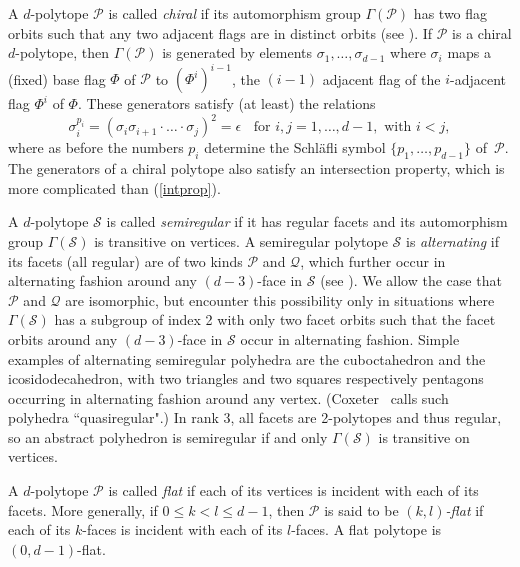 \documentclass[12pt]{amsart}
\theoremstyle{definition}
\begin{document}
A $d$-polytope $\mathcal{P}$ is called \emph{chiral\/} if its automorphism group $\Gamma(\mathcal{P})$ has two flag orbits such that any two adjacent flags are in distinct orbits (see \cite{Pel2025,SchWei1991}). If $\mathcal{P}$ is a chiral $d$-polytope, then $\Gamma(\mathcal{P})$ is generated by elements $\sigma_1,\ldots,\sigma_{d-1}$ where $\sigma_i$ maps a (fixed) base flag $\Phi$ of $\mathcal{P}$ to $(\Phi^{i})^{i-1}$, the $(i-1)$ adjacent flag of the $i$-adjacent flag $\Phi^i$ of $\Phi$. These generators satisfy (at least) the relations
\begin{equation}
\label{chiralrel}
\sigma_i^{p_i} = (\sigma_i\sigma_{i+1}\cdot\ldots\cdot\sigma_j)^{2} = \epsilon
\;\; \textrm{ for } i,j=1,\dots,d-1,  \textrm{ with } i<j,
\end{equation}
where as before the numbers $p_i$ determine the Schl\"afli symbol $\{p_1,\ldots,p_{d-1}\}$ of~$\mathcal{P}$. The generators of a chiral polytope also satisfy an intersection property, which is more complicated than (\ref{intprop}).

A $d$-polytope $\mathcal S$ is called {\it semiregular\/} if it has regular facets and its automorphism group $\Gamma(\mathcal{S})$ is transitive on vertices. A semiregular polytope $\mathcal S$ is {\it alternating} if its facets (all regular) are of two kinds $\mathcal P$ and $\mathcal Q$, which further occur in alternating fashion around any $(d-3)$-face in $\mathcal S$ (see \cite{MonSch2012,MonSch2020}). 
We allow the case that $\mathcal{P}$ and $\mathcal Q$ are isomorphic, but encounter this possibility  only in situations where $\Gamma(\mathcal{S})$ has a subgroup of index 2 with only two facet orbits such that the facet orbits around any $(d-3)$-face in $\mathcal S$ occur in alternating fashion. Simple examples of alternating semiregular polyhedra are the cuboctahedron and the icosidodecahedron, with two triangles and two squares respectively pentagons occurring in alternating fashion around any vertex. (Coxeter~\cite{Cox1973} calls such polyhedra ``quasiregular".) In rank 3, all facets are 2-polytopes and thus regular, so an abstract polyhedron is semiregular if and only $\Gamma(\mathcal{S})$ is transitive on vertices. 

A $d$-polytope $\mathcal{P}$ is called {\em flat\/} if each of its vertices is incident with each of its facets.  More generally, if $0 \leq k < l \leq d-1$, then $\mathcal{P}$ is said to be {\em $(k,l)$-flat\/} if each of its $k$-faces is incident with each of its $l$-faces. A flat polytope is $(0,d-1)$-flat.
\smallskip
\end{document}

